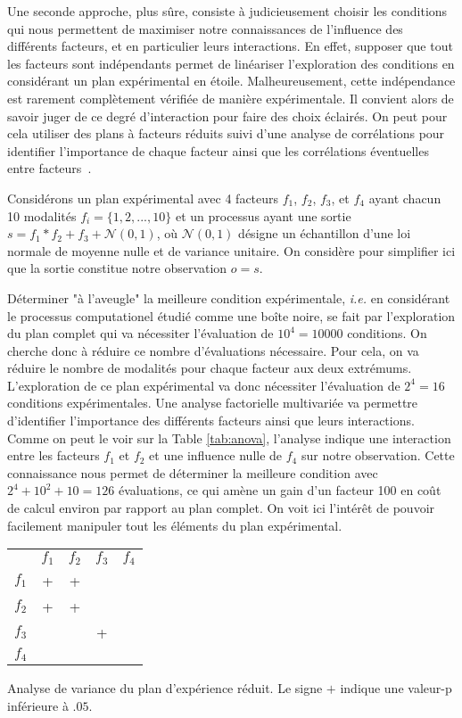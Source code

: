 Une seconde approche, plus sûre, consiste à judicieusement choisir les conditions qui nous permettent de maximiser notre connaissances de l'influence des différents facteurs, et en particulier leurs interactions. En effet, supposer que tout les facteurs sont indépendants permet de linéariser l'exploration des conditions en considérant un plan expérimental en étoile. Malheureusement, cette indépendance est rarement complètement vérifiée de manière expérimentale. Il convient alors de savoir juger de ce degré d'interaction pour faire des choix éclairés. On peut pour cela utiliser des plans à facteurs réduits suivi d'une analyse de corrélations pour identifier l'importance de chaque facteur ainsi que les corrélations éventuelles entre facteurs~\cite{montgomery2017design}.

Considérons un plan expérimental avec 4 facteurs $f_1$, $f_2$, $f_3$, et $f_4$ ayant chacun 10 modalités $f_i = \{1, 2, ..., 10\}$ et un processus ayant une sortie $s=f_1*f_2+f_3+\mathcal{N}(0, 1)$, où $\mathcal{N}(0, 1)$ désigne un échantillon d'une loi normale de moyenne nulle et de variance unitaire. On considère pour simplifier ici que la sortie constitue notre observation $o=s$.

Déterminer "à l'aveugle" la meilleure condition expérimentale, \textit{i.e.} en considérant le processus computationel étudié comme une boîte noire, se fait  par l'exploration du plan complet qui va nécessiter l'évaluation de $10^4=10000$ conditions. On cherche donc à réduire ce nombre d'évaluations nécessaire. Pour cela, on va réduire le nombre de modalités pour chaque facteur aux deux extrémums. L'exploration de ce plan expérimental va donc nécessiter l'évaluation de $2^4 = 16$ conditions expérimentales. Une analyse factorielle multivariée va permettre d'identifier l'importance des différents facteurs ainsi que leurs interactions. Comme on peut le voir sur la Table \ref{tab:anova}, l'analyse indique une interaction entre les facteurs $f_1$ et $f_2$ et une influence nulle de $f_4$ sur notre observation. Cette connaissance nous permet de déterminer la meilleure condition avec $2^4+10^2+10=126$ évaluations, ce qui amène un gain d'un facteur 100 en coût de calcul environ par rapport au plan complet. On voit ici l'intérêt de pouvoir facilement manipuler tout les éléments du plan expérimental.


\begin{margintable}
\begin{tabular}{ccccc}
  & $f_1$ & $f_2$ & $f_3$ & $f_4$ \\
$f_1$  &  + & + & & \\
$f_2$  & + & + & & \\
$f_3$  & & & + & \\
$f_4$  & & & & \\
\end{tabular}
\caption{Analyse de variance du plan d'expérience réduit. Le signe $+$ indique une valeur-p inférieure à $.05$.}
\label{tab:anova}
\end{margintable}


